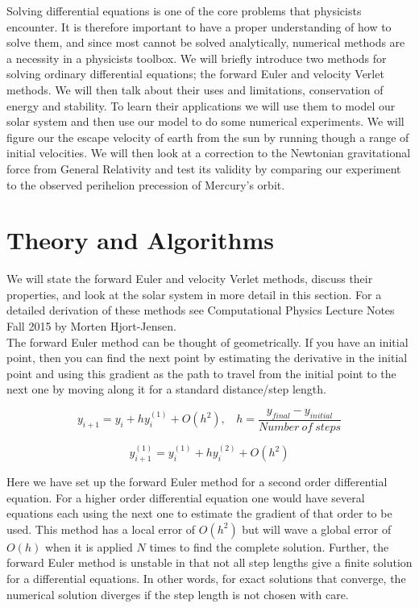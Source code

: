 \documentclass[a4paper,11pt]{article}
\begin{document}
{Solving differential equations is one of the core problems that physicists encounter. It is therefore important to have a proper understanding of how to solve them, and since most cannot be solved analytically, numerical methods are a necessity in a physicists toolbox. We will briefly introduce two methods for solving ordinary differential equations; the forward Euler and velocity Verlet methods. We will then talk about their uses and limitations, conservation of energy and stability. To learn their applications we will use them to model our solar system and then use our model to do some numerical experiments. We will figure our the escape velocity of earth from the sun by running though a range of initial velocities. We will then look at a correction to the Newtonian gravitational force from General Relativity and test its validity by comparing our experiment to the observed perihelion precession of Mercury's orbit. 





\section*{Theory and Algorithms}

We will state the forward Euler and velocity Verlet methods, discuss their properties, and look at the solar system in more detail in this section. For a detailed derivation of these methods see Computational Physics Lecture Notes Fall 2015 \cite{M.Hjort-Jensen_CompFys} by Morten Hjort-Jensen.\\

The forward Euler method can be thought of geometrically. If you have an initial point, then you can find the next point by estimating the derivative in the initial point and using this gradient as the path to travel from the initial point to the next one by moving along it for a standard distance/step length. 

\begin{equation}
y_{i+1} = y_i + h y^{(1)}_{i} + O(h^2), \: \: \: \: h = \frac{y_{final}-y_{initial}}{Number\: of\: steps}
\label{Euler}	
\end{equation}

\begin{equation*}
y^{(1)}_{i+1} = y^{(1)}_i + h y^{(2)}_i + O(h^2)
\end{equation*}

Here we have set up the forward Euler method for a second order differential equation. For a higher order differential equation one would have several equations each using the next one to estimate the gradient of that order to be used. This method has a local error of $O(h^2)$ but will wave a global error of $O(h)$ when it is applied $N$ times to find the complete solution. Further, the forward Euler method is unstable in that not all step lengths give a finite solution for a differential equations. In other words, for exact solutions that converge, the numerical solution diverges if the step length is not chosen with care. \\

}
\end{document}
